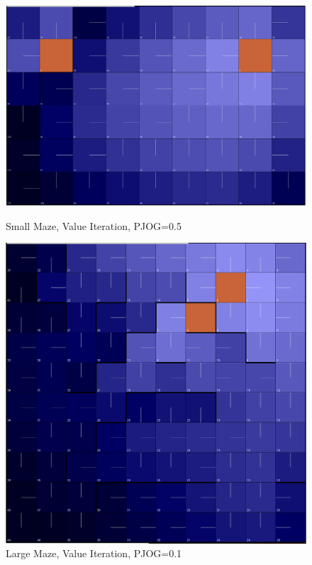 \documentclass[11pt]{article}
\begin{document}
\begin{figure}[!htb]
   \begin{minipage}{0.4\textwidth}
     \centering
     \includegraphics[width=1.2\linewidth]{../figures/value1_5.png}
     \caption{Small Maze, Value Iteration, PJOG=0.5}\label{Fig:value1_5}
   \end{minipage}\hfill
   \begin{minipage}{0.4\textwidth}
     \centering
     \includegraphics[width=1.2\linewidth]{../figures/value2_1.png}
     \caption{Large Maze, Value Iteration, PJOG=0.1}\label{Fig:value2_1}
   \end{minipage}
\end{figure}
\end{document}
